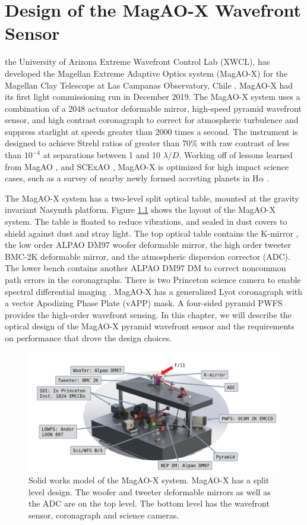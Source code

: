 \chapter{Design of the MagAO-X Wavefront Sensor}\label{CH5}

the University of Arizona Extreme Wavefront Control Lab (XWCL), has developed the Magellan Extreme Adaptive Optics system (MagAO-X) for the Magellan Clay Telescope at Las Campanas Observatory, Chile \citep{males2020magao}. MagAO-X had its first light commissioning run in December 2019. The MagAO-X system uses a combination of a 2048 actuator deformable mirror, high-speed pyramid wavefront sensor, and high contrast coronagraph to correct for atmospheric turbulence and suppress starlight at speeds greater than 2000 times a second. The instrument is designed to achieve Strehl ratios of greater than 70$\%$ with raw contrast of less than $10^{-4}$ at separations between 1 and 10 $\lambda/D$.\citep{males2018magao} Working off of lessons learned from MagAO \citep{close2018status}, and SCExAO \citep{jovanovic2015subaru}, MagAO-X is optimized for high impact science cases, such as a survey of nearby newly formed accreting planets in H$\alpha$ \citep{males2020magao}.

The MagAO-X system has a two-level split optical table, mounted at the gravity invariant Nasymth platform. Figure \ref{fig:magaox} shows the layout of the MagAO-X system. The table is floated to reduce vibrations, and sealed in dust covers to shield against dust and stray light. The top optical table contains the K-mirror \citep{hedglen2018optical}, the low order ALPAO DM97 woofer deformable mirror, the high order tweeter BMC-2K deformable mirror, and the atmospheric dispersion corrector (ADC). The lower bench contains another ALPAO DM97 DM to correct noncommon path errors in the coronagraphs. There is two Princeton science camera to enable spectral differential imaging \citep{biller_sdi}. MagAO-X has a generalized Lyot coronagraph with a vector Apodizing Phase Plate (vAPP) mask. A four-sided pyramid PWFS provides the high-order wavefront sensing.  In this chapter, we will describe the optical design of the MagAO-X pyramid wavefront sensor and the requirements on performance that drove the design choices.

\begin{figure}
    \centering
    \includegraphics[width=.8\textwidth]{Chapter Materials/Chapter Five Materials/magaox.jpg}
    \caption{Solid works model of the MagAO-X system. MagAO-X has a split level design. The woofer and tweeter deformable mirrors as well as the ADC are on the top level. The bottom level has the wavefront sensor, coronagraph and science cameras.}
    \label{fig:magaox}
\end{figure}


